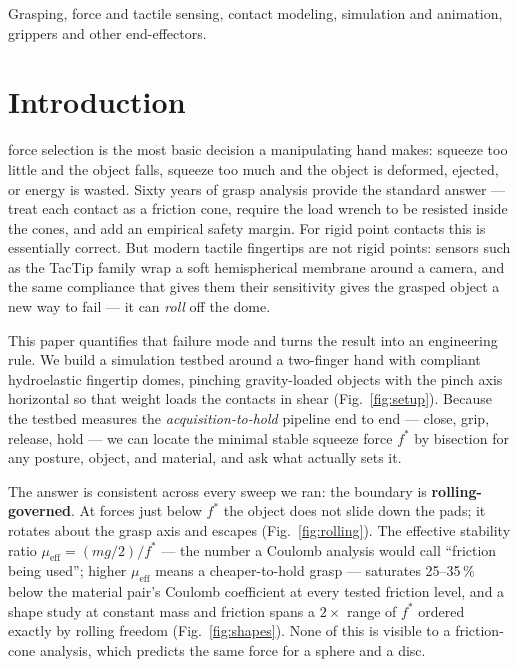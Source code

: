 \documentclass[journal]{IEEEtran}
\newcommand{\mueff}{\mu_{\mathrm{eff}}}
\newcommand{\fstar}{f^{*}}
\begin{document}
\begin{IEEEkeywords}
Grasping, force and tactile sensing, contact modeling, simulation and
animation, grippers and other end-effectors.
\end{IEEEkeywords}

\IEEEpeerreviewmaketitle

\section{Introduction}

 force selection is the most basic decision a
manipulating hand makes: squeeze too little and the object falls, squeeze
too much and the object is deformed, ejected, or energy is wasted. Sixty
years of grasp analysis provide the standard answer --- treat each contact
as a friction cone, require the load wrench to be resisted inside the
cones, and add an empirical safety margin. For rigid point contacts this is
essentially correct. But modern tactile fingertips are not rigid points:
sensors such as the TacTip family
\cite{chorley2009development,wardcherrier2018tactip} wrap a soft
hemispherical membrane around a camera, and the same compliance that gives
them their sensitivity gives the grasped object a new way to fail --- it
can \emph{roll} off the dome.

This paper quantifies that failure mode and turns the result into an
engineering rule. We build a simulation testbed around a two-finger hand
with compliant hydroelastic fingertip domes, pinching gravity-loaded
objects with the pinch axis horizontal so that weight loads the contacts in
shear (Fig.~\ref{fig:setup}). Because the testbed measures the
\emph{acquisition-to-hold} pipeline end to end --- close, grip, release,
hold --- we can locate the minimal stable squeeze force $\fstar$ by
bisection for any posture, object, and material, and ask what actually sets
it.

The answer is consistent across every sweep we ran: the boundary is
\textbf{rolling-governed}. At forces just below $\fstar$ the object does
not slide down the pads; it rotates about the grasp axis and escapes
(Fig.~\ref{fig:rolling}). The effective stability ratio
$\mueff = (mg/2)/\fstar$ --- the number a Coulomb analysis would call
``friction being used''; higher $\mueff$ means a cheaper-to-hold grasp ---
saturates 25--35\,\% below the material pair's Coulomb coefficient at every
tested friction level, and a shape study at constant mass and friction
spans a $2\times$ range of $\fstar$ ordered exactly by rolling freedom
(Fig.~\ref{fig:shapes}). None of this is visible to a friction-cone
analysis, which predicts the same force for a sphere and a disc.
\end{document}
